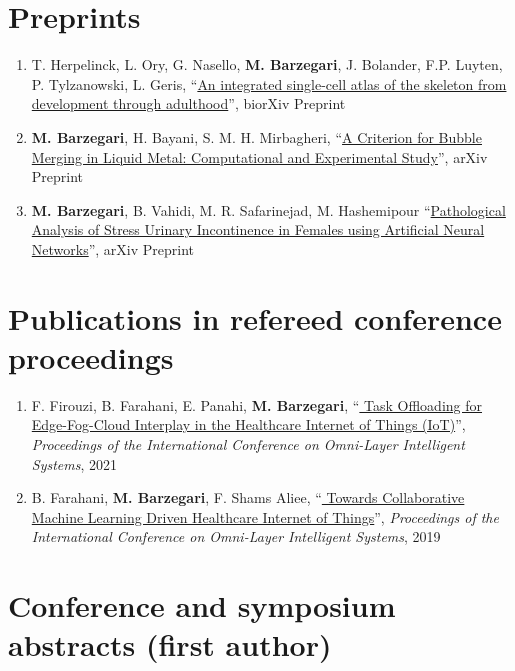 \section*{Preprints}
\begin{enumerate}
\item
T. Herpelinck,  L. Ory,  G. Nasello, \textbf{M. Barzegari}, J. Bolander,  F.P. Luyten,  P. Tylzanowski,  L. Geris, ``\href{https://www.biorxiv.org/content/10.1101/2022.03.14.484345v2}{An integrated single-cell atlas of the skeleton from development through adulthood}'', biorXiv Preprint
\item
\textbf{M. Barzegari}, H. Bayani, S. M. H. Mirbagheri, ``\href{https://arxiv.org/abs/1708.01608}{A Criterion for Bubble Merging in Liquid Metal: Computational and Experimental Study}'', arXiv Preprint
\item
\textbf{M. Barzegari}, B. Vahidi, M. R. Safarinejad, M. Hashemipour ``\href{https://arxiv.org/abs/1803.01843}{Pathological Analysis of Stress Urinary Incontinence in Females using Artificial Neural Networks}'', arXiv Preprint
\end{enumerate}

\section*{Publications in refereed conference proceedings}
\begin{enumerate}
\item
F. Firouzi, B. Farahani, E. Panahi, \textbf{M. Barzegari}, ``\href{https://ieeexplore.ieee.org/abstract/document/9524098}{
Task Offloading for Edge-Fog-Cloud Interplay in the Healthcare Internet of Things (IoT)}'', \textit{Proceedings of the International Conference on Omni-Layer Intelligent Systems}, 2021
\item
B. Farahani, \textbf{M. Barzegari}, F. Shams Aliee, ``\href{https://dl.acm.org/citation.cfm?id=3312644}{
Towards Collaborative Machine Learning Driven Healthcare Internet of Things}'', \textit{Proceedings of the International Conference on Omni-Layer Intelligent Systems}, 2019 
\end{enumerate}

\section*{Conference and symposium abstracts (first author)}

